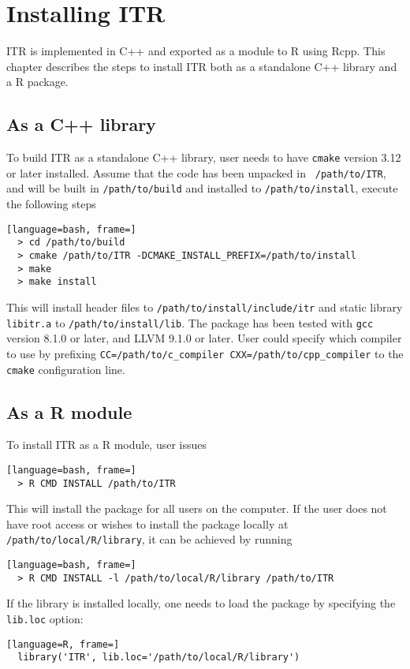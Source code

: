 \chapter{Installing ITR}
\label{ch:install}

ITR is implemented in C++ and exported as a module to R using Rcpp. This chapter
describes the steps to install ITR both as a standalone C++ library and a R
package. 

\section{As a C++ library}
\label{sec:c}
To build ITR as a standalone C++ library, user needs to have {\tt cmake} version
3.12 or later installed. Assume that the code has been unpacked in {\tt
  /path/to/ITR}, and will be built in {\tt /path/to/build} and installed to
{\tt /path/to/install}, execute the following steps

\begin{lstlisting}[language=bash, frame=]
  > cd /path/to/build
  > cmake /path/to/ITR -DCMAKE_INSTALL_PREFIX=/path/to/install
  > make
  > make install
\end{lstlisting}

This will install header files to {\tt /path/to/install/include/itr} and
static library {\tt libitr.a} to {\tt /path/to/install/lib}. The package
has been tested with {\tt gcc} version 8.1.0 or later, and LLVM 9.1.0 or later.
User could specify which compiler to use by prefixing
{\tt CC=/path/to/c\_compiler CXX=/path/to/cpp\_compiler} to the
{\tt cmake} configuration line.

\section{As a R module}
To install ITR as a R module, user issues 
\begin{lstlisting}[language=bash, frame=]
  > R CMD INSTALL /path/to/ITR
\end{lstlisting}

This will install the package for all users on the computer. If the
user does not have root access or wishes to install the package locally at
{\tt /path/to/local/R/library}, it can be achieved by running 
\begin{lstlisting}[language=bash, frame=]
  > R CMD INSTALL -l /path/to/local/R/library /path/to/ITR
\end{lstlisting}

If the library is installed locally, one needs to load the package by
specifying the {\tt lib.loc} option: 
\begin{lstlisting}[language=R, frame=]
  library('ITR', lib.loc='/path/to/local/R/library')
\end{lstlisting}

